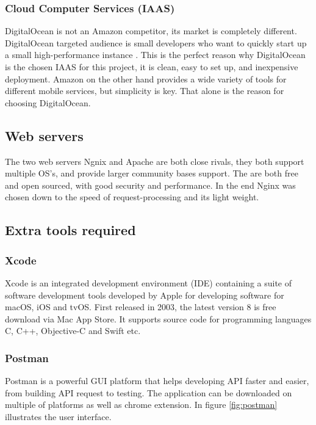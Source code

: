\subsubsection{Cloud Computer Services (IAAS)}
DigitalOcean is not an Amazon competitor, its market is completely different. DigitalOcean targeted audience is small developers who want to quickly start up a small high-performance instance \cite{iaas}. This is the perfect reason why DigitalOcean is the chosen IAAS for this project, it is clean, easy to set up, and inexpensive deployment. Amazon on the other hand provides a wide variety of tools for different mobile services, but simplicity is key. That alone is the reason for choosing DigitalOcean.

\subsection{Web servers}
The two web servers Ngnix and Apache are both close rivals, they both support multiple OS's, and provide larger community bases support. The are both free and open sourced, with good security and performance. In the end Nginx was chosen down to the speed of request-processing and its light weight. \cite{server_choice}

\subsection{Extra tools required}

\subsubsection{Xcode}

Xcode is an integrated development environment (IDE) containing a suite of software development tools developed by Apple for developing software for macOS, iOS and tvOS. First released in 2003, the latest version 8 is free download via Mac App Store. It supports source code for programming languages C, C++, Objective-C and Swift etc. 

\subsubsection{Postman}

Postman is a powerful GUI platform that helps developing API faster and easier, from building API request to testing. The application can be downloaded on multiple of platforms as well as chrome extension. In figure \ref{fig:postman} illustrates the user interface. 

